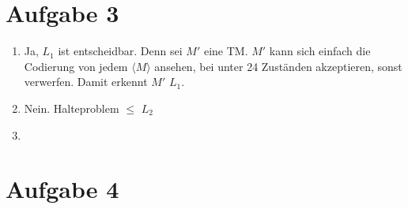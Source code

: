 \documentclass[a4paper,11pt]{scrartcl}
\begin{document}
	\section*{Aufgabe 3}
	\begin{enumerate}[label=\alph*)]
	\item	Ja, $L_1$ ist entscheidbar. Denn sei $M'$ eine TM. $M'$ kann sich einfach die Codierung von jedem $\langle M \rangle$ ansehen, bei unter 24 Zuständen akzeptieren, sonst verwerfen. Damit erkennt $M'$ $L_1$.
	
	\item	Nein. Halteproblem $\leq$ $L_2$
	
	\item	
	\end{enumerate}
	
	\section*{Aufgabe 4}
	
\end{document}
